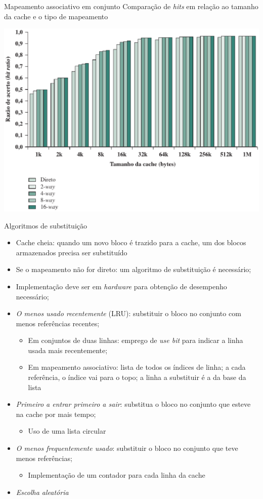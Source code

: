 \begin{slide}{Mapeamento associativo em conjunto}
	Comparação de \emph{hits} em relação ao tamanho da cache e o tipo de mapeamento
	\begin{center}
		\includegraphics[height=0.5\textwidth]{figs/razao-acerto-tipo}
	\end{center}
\end{slide}

\begin{slide}{Algoritmos de substituição}
	\small
\begin{itemize}
   \item Cache cheia: quando um novo bloco é trazido para a cache, um dos blocos armazenados precisa ser substituído
   \item Se o mapeamento não for direto: um algoritmo de substituição é necessário;
   \item Implementação deve ser em \emph{hardware} para obtenção de desempenho necessário;
   \item \emph{O menos usado recentemente} (LRU): substituir o bloco no conjunto com menos referências recentes;
	   \begin{itemize}
		   \item Em conjuntos de duas linhas: emprego de \emph{use bit} para indicar a linha usada mais recentemente;
		   \item Em mapeamento associativo: lista de todos os índices de linha; a cada referência, o índice vai para o topo; a linha a substituir é a da base da lista
	   \end{itemize}
   \item \emph{Primeiro a entrar primeiro a sair}: substitua o bloco no conjunto que esteve na cache por mais tempo;
	   \begin{itemize}
		   \item Uso de uma lista circular
	   \end{itemize}
   \item \emph{O menos frequentemente usado}: substituir o bloco no conjunto que teve menos referências;
	   \begin{itemize}
		   \item Implementação de um contador para cada linha da cache
	   \end{itemize}
   \item \emph{Escolha aleatória}
\end{itemize}
\end{slide}

